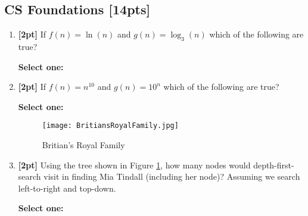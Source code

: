 \documentclass[12pt]{article}
\renewcommand{\circle}{\tikz\draw[black] (0,0) circle (1ex);}
\begin{document}
\subsection{CS Foundations [14pts]}
\begin{enumerate}
    \item \textbf{[2pt]} If $f(n)=\ln(n)$ and $g(n)=\log_3(n)$ which of the following are true?

    \textbf{Select one:}


    \item \textbf{[2pt]} If $f(n)=n^{10}$ and $g(n)=10^n$ which of the following are true?

    \textbf{Select one:}


    \begin{figure}[H]
        \centering
        \texttt{[image: BritiansRoyalFamily.jpg]}
        \caption{Britian's Royal Family}
        \label{fig:family}
    \end{figure}
    
    \item \textbf{[2pt]} Using the tree shown in Figure \ref{fig:family}, how many nodes would depth-first-search visit in finding Mia Tindall (including her node)? Assuming we search left-to-right and top-down.

    \textbf{Select one:}


\end{enumerate}
\end{document}
